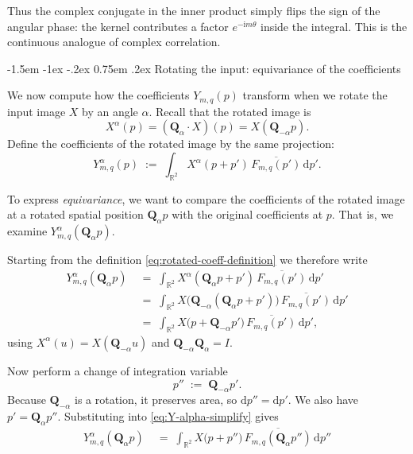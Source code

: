 \documentclass[12pt]{article}
\makeatletter
\renewcommand\subsection{\@startsection{subsection}{2}{\z@}%
                                     {-1.5em \@plus -1ex \@minus -.2ex}%
                                     {0.75em \@plus .2ex}%
                                     {\normalfont\large\bfseries}}
\makeatother
\begin{document}
Thus the complex conjugate in the inner product simply flips the sign
of the angular phase: the kernel contributes a factor
$e^{-\mathrm{i}m\theta}$ inside the integral. This is the continuous
analogue of complex correlation.


\subsection{Rotating the input: equivariance of the coefficients}

We now compute how the coefficients $Y_{m,q}(p)$ transform when we
rotate the input image $X$ by an angle $\alpha$. Recall that the
rotated image is
\[
  X^\alpha(p) = (\mathbf{Q}_\alpha \cdot X)(p) = X(\mathbf{Q}_{-\alpha}p).
\]
Define the coefficients of the rotated image by the same projection:
\begin{equation}
  \label{eq:rotated-coeff-definition}
  Y^{\alpha}_{m,q}(p)
  \;:=\;
  \int_{\mathbb{R}^2}
    X^\alpha(p + p')\,
    \overline{F_{m,q}(p')}\,
  \mathrm{d}p'.
\end{equation}

To express \emph{equivariance}, we want to compare the coefficients
of the rotated image at a rotated spatial position
$\mathbf{Q}_\alpha p$ with the original coefficients at $p$. That is,
we examine $Y^{\alpha}_{m,q}(\mathbf{Q}_\alpha p)$.

Starting from the definition
\eqref{eq:rotated-coeff-definition} we therefore write
\begin{align}
  Y^{\alpha}_{m,q}(\mathbf{Q}_\alpha p)
  \;&=\;
  \int_{\mathbb{R}^2}
    X^\alpha(\mathbf{Q}_\alpha p + p')\,
    \overline{F_{m,q}(p')}\,
  \mathrm{d}p'
  \label{eq:Y-alpha-start}
  \\
  \;&=\;
  \int_{\mathbb{R}^2}
    X\bigl(\mathbf{Q}_{-\alpha}(\mathbf{Q}_\alpha p + p')\bigr)\,
    \overline{F_{m,q}(p')}\,
  \mathrm{d}p'
  \label{eq:Y-alpha-pullback}
  \\
  \;&=\;
  \int_{\mathbb{R}^2}
    X\bigl(p + \mathbf{Q}_{-\alpha}p'\bigr)\,
    \overline{F_{m,q}(p')}\,
  \mathrm{d}p',
  \label{eq:Y-alpha-simplify}
\end{align}
using $X^\alpha(u) = X(\mathbf{Q}_{-\alpha}u)$ and
$\mathbf{Q}_{-\alpha}\mathbf{Q}_\alpha = I$.



Now perform a change of integration variable
\begin{equation}
  \label{eq:rotation-change-of-variable}
  p'' \;:=\; \mathbf{Q}_{-\alpha}p'.
\end{equation}
Because $\mathbf{Q}_{-\alpha}$ is a rotation, it preserves area, so
$\mathrm{d}p'' = \mathrm{d}p'$. We also have
$p' = \mathbf{Q}_{\alpha}p''$. Substituting into
\eqref{eq:Y-alpha-simplify} gives
\begin{align}
  Y^{\alpha}_{m,q}(\mathbf{Q}_\alpha p)
  \;&=\;
  \int_{\mathbb{R}^2}
    X\bigl(p + p''\bigr)\,
    \overline{F_{m,q}(\mathbf{Q}_\alpha p'')}\,
  \mathrm{d}p''
  \label{eq:Y-alpha-after-change}
\end{align}
\end{document}
